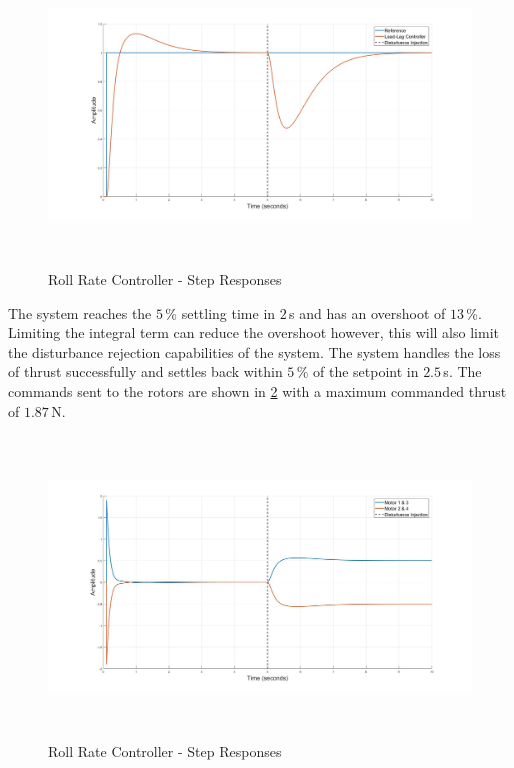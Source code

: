 		\begin{figure}[H]
			\centering
			\includegraphics[height = 8cm]{../Design/Matlab/Controllers/roll_rate_step.jpg}
			\caption{Roll Rate Controller -  Step Responses}
			\label{IM_RollRateStep}
		\end{figure}
		
		The system reaches the $5$\,\% settling time in $2$\,s and has an overshoot of $13$\,\%. Limiting the integral term can reduce the overshoot however, this will also limit the disturbance rejection capabilities of the system. The system handles the loss of thrust successfully and settles back within $5$\,\% of the setpoint in $2.5$\,s. The commands sent to the rotors are shown in \ref{IM_RollRateImpulse} with a maximum commanded thrust of $1.87$\,N.  
		
		\begin{figure}[H]
			\centering
			\includegraphics[height = 8cm]{../Design/Matlab/Controllers/roll_rate_impulse.jpg}
			\caption{Roll Rate Controller -  Step Responses}
			\label{IM_RollRateImpulse}
		\end{figure}
		
